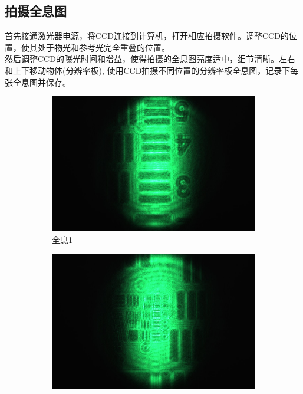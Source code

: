 \documentclass[a4paper,draft]{report}
\begin{document}
\subsection{拍摄全息图}
首先接通激光器电源，将CCD连接到计算机，打开相应拍摄软件。调整CCD的位置，使其处于物光和参考光完全重叠的位置。\\
然后调整CCD的曝光时间和增益，使得拍摄的全息图亮度适中，细节清晰。左右和上下移动物体(分辨率板),
使用CCD拍摄不同位置的分辨率板全息图，记录下每张全息图并保存。
\begin{figure}[H]
\centering
\begin{subfigure}{0.3\textwidth}
    \centering
    \includegraphics[width=\linewidth]{lizhou1}
    \caption{全息1}
    \label{Fig.sub.1}
\end{subfigure}
\hfill
\begin{subfigure}{0.3\textwidth}
    \centering
    \includegraphics[width=\linewidth]{lizhou2}

\end{subfigure}
\end{figure}
\end{document}
